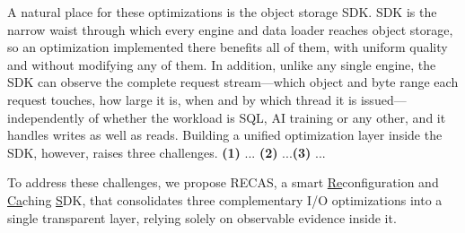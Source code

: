 A natural place for these optimizations is the object storage SDK.
SDK is the narrow waist through which every engine and data loader reaches object storage, so an optimization implemented there benefits all of them, with uniform quality and without modifying any of them. In addition, unlike any single engine, the SDK can observe the complete request stream---which object and byte range each request touches, how large it is, when and by which
thread it is issued---independently of whether the workload is SQL, AI training or any other, and it handles writes as well as reads. Building
a unified optimization layer inside the SDK, however, raises three challenges.
\textbf{(1)} ... \textbf{(2)} ...\textbf{(3)} ...

To address these challenges, we propose RECAS, a smart \underline{Re}configuration and \underline{Ca}ching \underline{S}DK, that consolidates three
complementary I/O optimizations %
into a single transparent layer, relying solely on observable evidence inside it. 



